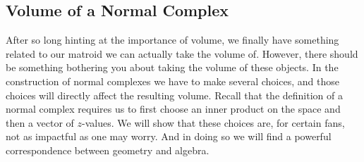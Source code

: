 \documentclass[12pt,oneside]{../../sfsuthesis}
\begin{document}
\begin{figure}[H]
\end{figure}

\subsection{Volume of a Normal Complex}

After so long hinting at the importance of volume, we finally have something related to our matroid we can actually take the volume of.
However, there should be something bothering you about taking the volume of these objects.
In the construction of normal complexes we have to make several choices, and those choices will directly affect the resulting volume.
Recall that the definition of a normal complex requires us to first choose an inner product on the space and then a vector of \( z \)-values.
We will show that these choices are, for certain fans, not as impactful as one may worry.
And in doing so we will find a powerful correspondence between geometry and algebra.
\end{document}
